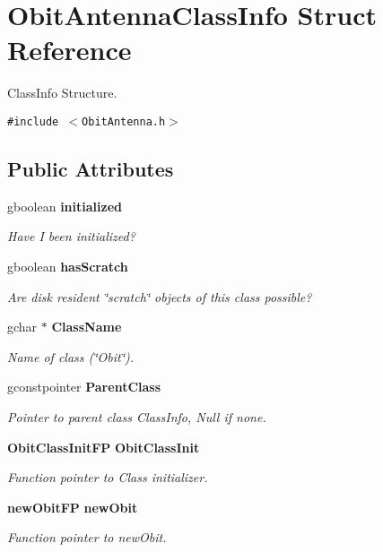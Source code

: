 \section{Obit\-Antenna\-Class\-Info Struct Reference}
\label{structObitAntennaClassInfo}
Class\-Info Structure.  


{\tt \#include $<$Obit\-Antenna.h$>$}

\subsection*{Public Attributes}
\begin{CompactItemize}
\item 
gboolean {\bf initialized}
\begin{CompactList}\small\item\em Have I been initialized? \item\end{CompactList}\item 
gboolean {\bf has\-Scratch}
\begin{CompactList}\small\item\em Are disk resident \char`\"{}scratch\char`\"{} objects of this class possible? \item\end{CompactList}\item 
gchar $\ast$ {\bf Class\-Name}
\begin{CompactList}\small\item\em Name of class (\char`\"{}Obit\char`\"{}). \item\end{CompactList}\item 
gconstpointer {\bf Parent\-Class}
\begin{CompactList}\small\item\em Pointer to parent class Class\-Info, Null if none. \item\end{CompactList}\item 
{\bf Obit\-Class\-Init\-FP} {\bf Obit\-Class\-Init}
\begin{CompactList}\small\item\em Function pointer to Class initializer. \item\end{CompactList}\item 
{\bf new\-Obit\-FP} {\bf new\-Obit}
\begin{CompactList}\small\item\em Function pointer to new\-Obit. \item\end{CompactList}\item 

\end{CompactItemize}
